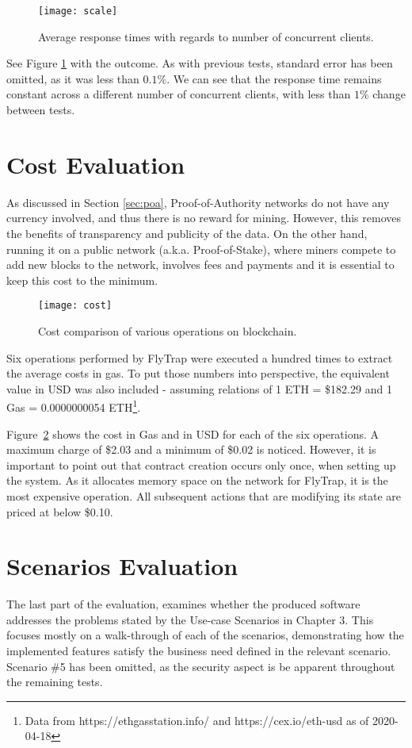 \begin{figure}[h]
    \centering
    \texttt{[image: scale]}
    \caption{Average response times with regards to number of concurrent clients.}
    \label{fig:scale}
\end{figure}
See Figure \ref{fig:scale} with the outcome. As with previous tests, standard error has been omitted, as it was less than $0.1\%$. We can see that the response time remains constant across a different number of concurrent clients, with less than $1\%$ change between tests.

\section{Cost Evaluation}
As discussed in Section \ref{sec:poa}, Proof-of-Authority networks do not have any currency involved, and thus there is no reward for mining. However, this removes the benefits of transparency and publicity of the data. On the other hand, running it on a public network (a.k.a. Proof-of-Stake), where miners compete to add new blocks to the network, involves fees and payments and it is essential to keep this cost to the minimum.

\begin{figure}[h]
    \centering
    \texttt{[image: cost]}
    \caption{Cost comparison of various operations on blockchain.}
    \label{fig:cost}
\end{figure}

Six operations performed by FlyTrap were executed a hundred times to extract the average costs in gas. To put those numbers into perspective, the equivalent value in USD was also included - assuming relations of 1 ETH = \$182.29 and 1 Gas = 0.0000000054 ETH\footnote{Data from https://ethgasstation.info/ and https://cex.io/eth-usd as of 2020-04-18}.

Figure~\ref{fig:cost} shows the cost in Gas and in USD for each of the six operations. A maximum charge of \$2.03 and a minimum of \$0.02 is noticed. However, it is important to point out that contract creation occurs only once, when setting up the system. As it allocates memory space on the network for FlyTrap, it is the most expensive operation. All subsequent actions that are modifying its state are priced at below \$0.10.


\section{Scenarios Evaluation}
The last part of the evaluation, examines whether the produced software addresses the problems stated by the Use-case Scenarios in Chapter 3. This focuses mostly on a walk-through of each of the scenarios, demonstrating how the implemented features satisfy the business need defined in the relevant scenario. Scenario \#5 has been omitted, as the security aspect is be apparent throughout the remaining tests.
